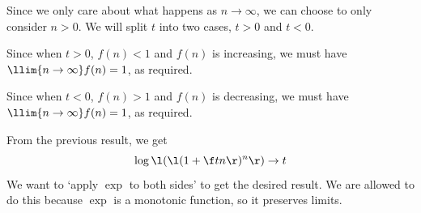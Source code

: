 \documentclass[a4paper]{article}
\begin{document}
Since we only care about what happens as $n \to \infty$, we can choose to only consider $n > 0$. We will split $t$ into two cases, $t > 0$ and $t < 0$.


Since when $t > 0$, $f(n) < 1$ and $f(n)$ is increasing, we must have $\llim{n \to \infty} f(n) = 1$, as required.


Since when $t < 0$, $f(n) > 1$ and $f(n)$ is decreasing, we must have $\llim{n \to \infty} f(n) = 1$, as required.

From the previous result, we get $$\log\l( \l( 1 + \f tn \r)^n \r) \to t$$
We want to \enquote*{apply $\exp$ to both sides} to get the desired result. We are allowed to do this because $\exp$ is a monotonic function, so it preserves limits.

\end{document}
